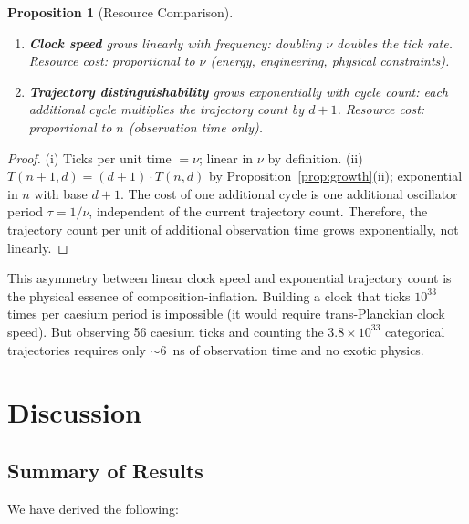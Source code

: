 \documentclass[twocolumn,10pt,a4paper]{article}
\newtheorem{proposition}[theorem]{Proposition}
\theoremstyle{definition}
\theoremstyle{remark}
\begin{document}
\begin{proposition}[Resource Comparison]
\label{prop:resources}
\begin{enumerate}[label=(\roman*)]
\item \textbf{Clock speed} grows linearly with frequency: doubling $\nu$ doubles the tick rate. Resource cost: proportional to $\nu$ (energy, engineering, physical constraints).
\item \textbf{Trajectory distinguishability} grows exponentially with cycle count: each additional cycle multiplies the trajectory count by $d+1$. Resource cost: proportional to $n$ (observation time only).
\end{enumerate}
\end{proposition}

\begin{proof}
(i) Ticks per unit time $= \nu$; linear in $\nu$ by definition. (ii) $T(n+1,d) = (d+1) \cdot T(n,d)$ by Proposition~\ref{prop:growth}(ii); exponential in $n$ with base $d+1$. The cost of one additional cycle is one additional oscillator period $\tau = 1/\nu$, independent of the current trajectory count. Therefore, the trajectory count per unit of additional observation time grows exponentially, not linearly.
\end{proof}

This asymmetry between linear clock speed and exponential trajectory count is the physical essence of composition-inflation. Building a clock that ticks $10^{33}$ times per caesium period is impossible (it would require trans-Planckian clock speed). But observing 56 caesium ticks and counting the $3.8 \times 10^{33}$ categorical trajectories requires only $\sim 6$~ns of observation time and no exotic physics.


\section{Discussion}
\label{sec:discussion}

\subsection{Summary of Results}

We have derived the following:
\end{document}
